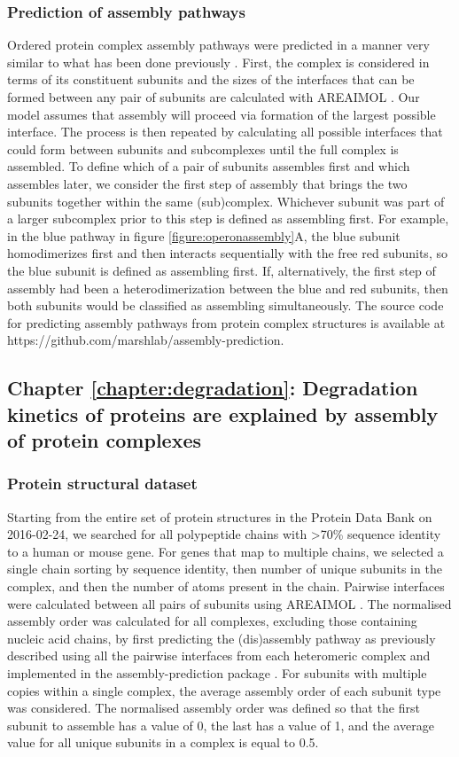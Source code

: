 \documentclass[a4paper,11pt,twoside,openright]{scrbook}
\begin{document}
\subsubsection{Prediction of assembly pathways}
Ordered protein complex assembly pathways were predicted in a manner very similar to what has been done previously \cite{Marsh2013}. First, the complex is considered in terms of its constituent subunits and the sizes of the interfaces that can be formed between any pair of subunits are calculated with AREAIMOL \cite{Winn2011}. Our model assumes that assembly will proceed via formation of the largest possible interface. The process is then repeated by calculating all possible interfaces that could form between subunits and subcomplexes until the full complex is assembled. To define which of a pair of subunits assembles first and which assembles later, we consider the first step of assembly that brings the two subunits together within the same (sub)complex. Whichever subunit was part of a larger subcomplex prior to this step is defined as assembling first. For example, in the blue pathway in figure \ref{figure:operonassembly}A, the blue subunit homodimerizes first and then interacts sequentially with the free red subunits, so the blue subunit is defined as assembling first. If, alternatively, the first step of assembly had been a heterodimerization between the blue and red subunits, then both subunits would be classified as assembling simultaneously. The source code for predicting assembly pathways from protein complex structures is available at https://github.com/marshlab/assembly-prediction.

\clearpage
\subsection{Chapter \ref*{chapter:degradation}: Degradation kinetics of proteins are explained by assembly of protein complexes}

\subsubsection{Protein structural dataset}
Starting from the entire set of protein structures in the Protein Data Bank on 2016-02-24, we searched for all polypeptide chains with >70\% sequence identity to a human or mouse gene. For genes that map to multiple chains, we selected a single chain sorting by sequence identity, then number of unique subunits in the complex, and then the number of atoms present in the chain. Pairwise interfaces were calculated between all pairs of subunits using AREAIMOL \cite{Winn2011}. The normalised assembly order was calculated for all complexes, excluding those containing nucleic acid chains, by first predicting the (dis)assembly pathway as previously described using all the pairwise interfaces from each heteromeric complex \cite{Marsh2013} and implemented in the assembly-prediction package \cite{Wells2016}. For subunits with multiple copies within a single complex, the average assembly order of each subunit type was considered. The normalised assembly order was defined so that the first subunit to assemble has a value of 0, the last has a value of 1, and the average value for all unique subunits in a complex is equal to 0.5.
\end{document}
